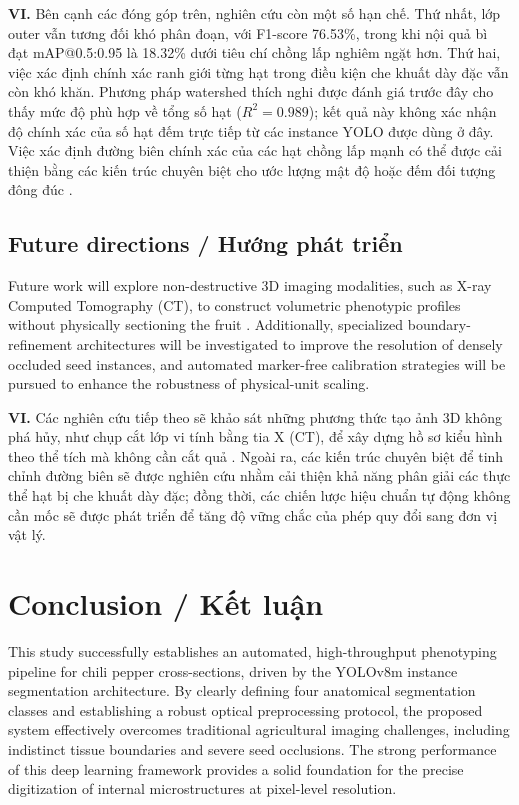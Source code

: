\documentclass[final,1p,11pt,longtitle]{elsarticle}
\newenvironment{viet}{\par\smallskip\begingroup\color{viColor}\noindent\textbf{VI. }\ignorespaces}{\par\endgroup\smallskip}
\begin{document}
\begin{viet}
Bên cạnh các đóng góp trên, nghiên cứu còn một số hạn chế. Thứ nhất, lớp outer vẫn tương đối khó phân đoạn, với F1-score 76.53\%, trong khi nội quả bì đạt mAP@0.5:0.95 là 18.32\% dưới tiêu chí chồng lấp nghiêm ngặt hơn. Thứ hai, việc xác định chính xác ranh giới từng hạt trong điều kiện che khuất dày đặc vẫn còn khó khăn. Phương pháp watershed thích nghi được đánh giá trước đây cho thấy mức độ phù hợp về tổng số hạt ($R^2=0.989$); kết quả này không xác nhận độ chính xác của số hạt đếm trực tiếp từ các instance YOLO được dùng ở đây. Việc xác định đường biên chính xác của các hạt chồng lấp mạnh có thể được cải thiện bằng các kiến trúc chuyên biệt cho ước lượng mật độ hoặc đếm đối tượng đông đúc \cite{x}.
\end{viet}


\subsection*{Future directions / {\color{viColor} Hướng phát triển}}
Future work will explore non-destructive 3D imaging modalities, such as X-ray Computed Tomography (CT), to construct volumetric phenotypic profiles without physically sectioning the fruit \cite{x, fruitseg}. Additionally, specialized boundary-refinement architectures will be investigated to improve the resolution of densely occluded seed instances, and automated marker-free calibration strategies will be pursued to enhance the robustness of physical-unit scaling.

\begin{viet}
Các nghiên cứu tiếp theo sẽ khảo sát những phương thức tạo ảnh 3D không phá hủy, như chụp cắt lớp vi tính bằng tia X (CT), để xây dựng hồ sơ kiểu hình theo thể tích mà không cần cắt quả \cite{x, fruitseg}. Ngoài ra, các kiến trúc chuyên biệt để tinh chỉnh đường biên sẽ được nghiên cứu nhằm cải thiện khả năng phân giải các thực thể hạt bị che khuất dày đặc; đồng thời, các chiến lược hiệu chuẩn tự động không cần mốc sẽ được phát triển để tăng độ vững chắc của phép quy đổi sang đơn vị vật lý.
\end{viet}



\section{Conclusion / {\color{viColor} Kết luận}}
This study successfully establishes an automated, high-throughput phenotyping pipeline for chili pepper cross-sections, driven by the YOLOv8m instance segmentation architecture. By clearly defining four anatomical segmentation classes and establishing a robust optical preprocessing protocol, the proposed system effectively overcomes traditional agricultural imaging challenges, including indistinct tissue boundaries and severe seed occlusions. The strong performance of this deep learning framework provides a solid foundation for the precise digitization of internal microstructures at pixel-level resolution.
\end{document}
